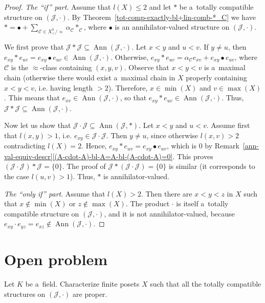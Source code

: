 \documentclass{jonasart}
\newcommand{\af}{\alpha}
\newcommand{\bl}{\bullet}
\newcommand{\C}{\mathcal{C}}
\newcommand{\J}{\mathcal{J}}
\newcommand{\sst}{\subseteq}
\DeclareMathOperator{\Ann}{Ann}
\begin{document}
	\begin{proof}
		\textit{The ``if'' part}. Assume that $l(X)\le 2$ and let $*$ be a~totally compatible structure on $(\J,\cdot)$. By Theorem~\ref{tot-comp-exactly-bl+lin-comb-*_C} we have $*=\bl+\sum_{\C\in X^3_< /{\approx}} \af_\C *_\C$, where $\bl$ is an annihilator-valued structure on $(\J,\cdot)$.

		We first prove that $\J*\J\sst\Ann(\J,\cdot)$. Let $x<y$ and $u<v$. If $y\ne u$, then $e_{xy}*e_{uv}=e_{xy}\bl e_{uv}\in\Ann(\J,\cdot)$. Otherwise, $e_{xy}*e_{uv}=\af_\C e_{xv}+e_{xy}\bl e_{uv}$, where $\C$ is the $\approx$-class containing $(x,y,v)$. Observe that $x<y<v$ is a~maximal chain (otherwise there would exist a~maximal chain in $X$ properly containing $x<y<v$, i.e. having length $>2$). Therefore, $x\in\min(X)$ and $v\in\max(X)$. This means that $e_{xv}\in\Ann(\J,\cdot)$, so that $e_{xy}*e_{uv}\in\Ann(\J,\cdot)$. Thus, $\J*\J\sst\Ann(\J,\cdot)$.

		Now let us show that $\J\cdot\J\sst\Ann(\J,*)$. Let $x<y$ and $u<v$. Assume first that $l(x,y)>1$, i.e. $e_{xy}\in\J\cdot \J$. Then $y\ne u$, since otherwise $l(x,v)>2$ contradicting $l(X)=2$. Hence, $e_{xy}*e_{uv}=e_{xy}\bl e_{uv}$, which is $0$ by Remark~\ref{ann-val-equiv-descr}\eqref{(A-cdot-A)-bl-A=A-bl-(A-cdot-A)=0}. This proves $(\J\cdot\J)*\J=\{0\}$. The proof of $\J*(\J\cdot\J)=\{0\}$ is similar (it corresponds to the case $l(u,v)>1$). Thus, $*$ is annihilator-valued.

		\textit{The ``only if'' part}. Assume that $l(X)>2$. Then there are $x<y<z$ in $X$ such that $x\not\in\min(X)$ or $z\not\in\max(X)$. The product $\cdot$ is itself a~totally compatible structure on $(\J,\cdot)$, and it is not annihilator-valued, because $e_{xy}\cdot e_{yz}=e_{xz}\not\in\Ann(\J,\cdot)$.
	\end{proof}

	\section{Open problem}

	\begin{problem}
		Let $K$ be a~field. Characterize finite posets $X$ such that all the totally compatible structures on $(\J,\cdot)$ are proper.
	\end{problem}
\end{document}

